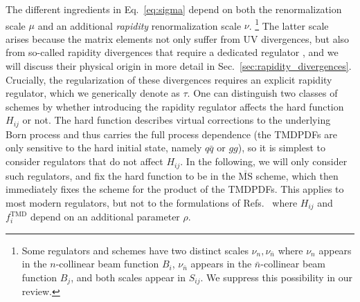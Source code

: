 \documentclass[11pt,a4paper]{article}
\DeclareRobustCommand{\eq}[1]{Eq.~\eqref{eq:#1}}
\DeclareRobustCommand{\sec}[1]{Sec.~\ref{sec:#1}}
\DeclareRobustCommand{\mycites}[1]{Refs.~\cite{#1}}
\newcommand{\MS}{\overline{\mathrm{MS}}}
\newcommand{\bn}{{\bar{n}}}
\newcommand\TMD{\mathrm{TMD}}
\begin{document}
The different ingredients in \eq{sigma} depend on both the renormalization scale $\mu$ and an additional \emph{rapidity} renormalization scale $\nu$.%
\footnote{Some regulators and schemes have two distinct scales $\nu_n, \nu_\bn$ where $\nu_n$ appears in the $n$-collinear beam function $B_i$, $\nu_\bn$ appears in the $\bn$-collinear beam function $B_j$, and both scales appear in $S_{ij}$. We suppress this possibility in our review.}
The latter scale arises because the matrix elements not only suffer from UV divergences, but also from so-called rapidity divergences that require a dedicated regulator \cite{Soper:1979fq,Collins:1981uk,Collins:1992tv,Collins:2008ht,Becher:2010tm,GarciaEchevarria:2011rb,Chiu:2011qc,Chiu:2012ir}, and we will discuss their physical origin in more detail in \sec{rapidity_divergences}.
Crucially, the regularization of these divergences requires an explicit rapidity regulator, which we generically denote as $\tau$.
One can distinguish two classes of schemes by whether introducing the rapidity regulator affects the hard function $H_{ij}$ or not.
The hard function describes virtual corrections to the underlying Born process and thus carries the full process dependence (the TMDPDFs are only sensitive to the hard initial state, namely $q\bar q$ or $gg$), so it is simplest to consider regulators that do not affect $H_{ij}$.
In the following, we will only consider such regulators, and fix the hard function to be in the $\MS$ scheme, which then immediately fixes the scheme for the product of the TMDPDFs.
This applies to most modern regulators, but not to the formulations of \mycites{Soper:1979fq,Collins:1981uk,Ji:2004wu} where $H_{ij}$ and $f_i^\TMD$ depend on an additional parameter $\rho$.
\end{document}
